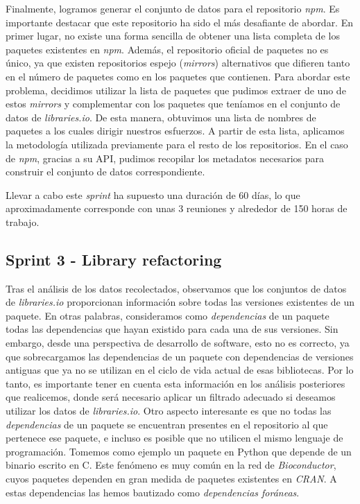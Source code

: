 Finalmente, logramos generar el conjunto de datos para el repositorio \textit{npm}. Es importante destacar que este 
repositorio ha sido el más desafiante de abordar. En primer lugar, no existe una forma sencilla de obtener una lista 
completa de los paquetes existentes en \textit{npm}. Además, el repositorio oficial de paquetes no es único, ya que 
existen repositorios espejo (\textit{mirrors}) alternativos que difieren tanto en el número de paquetes como en los 
paquetes que contienen. Para abordar este problema, decidimos utilizar la lista de paquetes que pudimos extraer de 
uno de estos \textit{mirrors} y complementar con los paquetes que teníamos en el conjunto de datos de \textit{libraries.io}. 
De esta manera, obtuvimos una lista de nombres de paquetes a los cuales dirigir nuestros esfuerzos. A partir de esta 
lista, aplicamos la metodología utilizada previamente para el resto de los repositorios. En el caso de \textit{npm}, 
gracias a su API, pudimos recopilar los metadatos necesarios para construir el conjunto de datos correspondiente.

Llevar a cabo este \textit{sprint} ha supuesto una duración de 60 días, lo que aproximadamente corresponde con unas 
3 reuniones y alrededor de 150 horas de trabajo.

\subsection{Sprint 3 - Library refactoring}

Tras el análisis de los datos recolectados, observamos que los conjuntos de datos de \textit{libraries.io} proporcionan 
información sobre todas las versiones existentes de un paquete. En otras palabras, consideramos como \textit{dependencias} 
de un paquete todas las dependencias que hayan existido para cada una de sus versiones. Sin embargo, desde una perspectiva 
de desarrollo de software, esto no es correcto, ya que sobrecargamos las dependencias de un paquete con dependencias de 
versiones antiguas que ya no se utilizan en el ciclo de vida actual de esas bibliotecas. Por lo tanto, es importante tener 
en cuenta esta información en los análisis posteriores que realicemos, donde será necesario aplicar un filtrado adecuado 
si deseamos utilizar los datos de \textit{libraries.io}.
Otro aspecto interesante es que no todas las \textit{dependencias} de un paquete se encuentran presentes en el repositorio 
al que pertenece ese paquete, e incluso es posible que no utilicen el mismo lenguaje de programación. Tomemos como ejemplo 
un paquete en Python que depende de un binario escrito en C. Este fenómeno es muy común en la red de \textit{Bioconductor}, 
cuyos paquetes dependen en gran medida de paquetes existentes en \textit{CRAN}. 
A estas dependencias las hemos bautizado como \textit{dependencias foráneas}.

